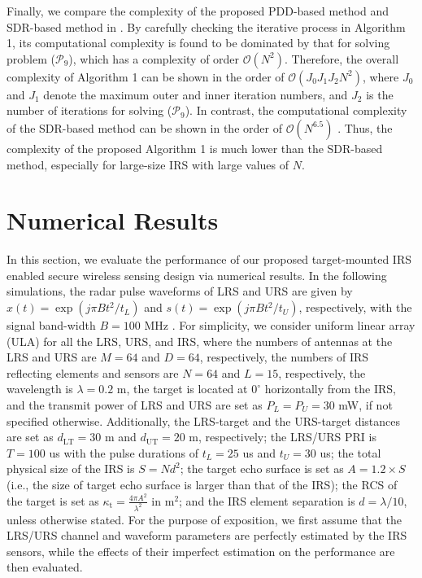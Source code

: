 \documentclass[10pt,final,doublecolumn]{IEEEtran}
\begin{document}
Finally, we compare the complexity of the proposed PDD-based method and SDR-based method in \cite{sdr}. By carefully checking the iterative process in Algorithm 1, its computational complexity is found to be dominated by that for solving problem ($\mathcal{P}_9$), which has a complexity of order $\mathcal{O}(N^2)$.
Therefore, the overall complexity of Algorithm 1 can be shown in the order of  $\mathcal{O}(J_0J_1J_2N^2)$, where $J_0$ and $J_1$ denote the maximum outer and inner iteration numbers, and $J_2$ is the number of iterations for solving ($\mathcal{P}_9$). In contrast, the computational complexity of the SDR-based method can be shown in the order of $\mathcal{O}(N^{6.5})$ \cite{sdr}. Thus, the complexity of the proposed Algorithm 1 is much lower than the SDR-based method, especially for large-size IRS with large values of $N$.


\section{Numerical Results}
In this section, we evaluate the performance of our proposed
target-mounted IRS enabled secure wireless sensing design
via numerical results. In the following simulations, the radar pulse waveforms of LRS and URS are given by $x(t)=\exp(j\pi B t^2/t_L)$ and $s(t)=\exp(j\pi B t^2/t_U)$, respectively, with the signal band-width $B=100$ MHz \cite{zeng_wave}. For simplicity, we consider uniform linear array (ULA) for all the LRS, URS, and IRS, where the numbers of antennas at the LRS and URS are $M=64$ and $D=64$, respectively, the numbers of IRS reflecting elements and sensors are $N= 64$ and $L=15$, respectively, the wavelength is $\lambda=0.2$ m, the target is located at $0^\circ$ horizontally from the IRS, and the transmit power of LRS and URS are set as $P_{L} =P_{U} = 30$ mW, if not specified otherwise.
Additionally, the LRS-target and the URS-target distances are set as $d_{\mathrm{LT}}=30$ m and $d_{\mathrm{UT}}=20$ m, respectively; the LRS/URS PRI is $T=100$ us with the pulse durations of $t_L=25$ us and $t_U=30$ us; the total physical size of the IRS is $S=N{d}^{2}$; the target echo surface is set as $A=1.2\times S$ (i.e., the size of target echo surface is larger than that of the IRS); the RCS of the target is set as $\kappa_{\mathrm{t}}=\frac{4\pi A^2}{\lambda^2}$ in m$^2$; and the IRS element separation is ${d}=\lambda/10$, unless otherwise stated. For the purpose of exposition, we first assume that the LRS/URS channel and waveform parameters are perfectly estimated by the IRS sensors, while the effects of their  imperfect estimation on the performance are then evaluated.
\end{document}
